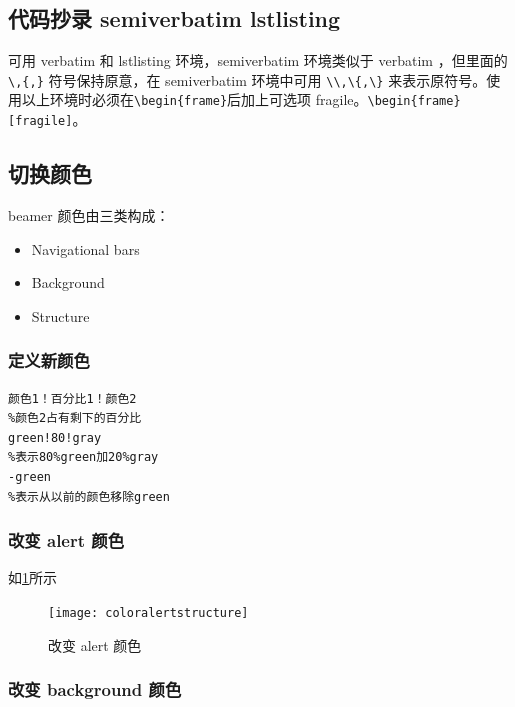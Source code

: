 \subsection{代码抄录 semiverbatim lstlisting}
可用 verbatim 和 lstlisting 环境，semiverbatim 环境类似于 verbatim ，但里面的 \verb|\,{,}| 符号保持原意，在 semiverbatim 环境中可用 \verb|\\,\{,\}| 来表示原符号。使用以上环境时必须在\verb|\begin{frame}|后加上可选项 fragile。\verb|\begin{frame}[fragile]|。

\subsection{切换颜色}


beamer 颜色由三类构成：
\begin{itemize}
  \item Navigational bars
  \item Background
  \item Structure
\end{itemize}
\subsubsection{定义新颜色}
\begin{shaded}
\begin{Verbatim}
颜色1！百分比1！颜色2
%颜色2占有剩下的百分比
green!80!gray
%表示80%green加20%gray
-green
%表示从以前的颜色移除green
\end{Verbatim}
\end{shaded}
\subsubsection{改变 alert 颜色}
如\ref{alert change}所示

\begin{figure}[H]
  \centering
  \texttt{[image: coloralertstructure]}\\
  \caption{改变 alert 颜色}\label{alert change}
\end{figure}
\subsubsection{改变 background 颜色}


